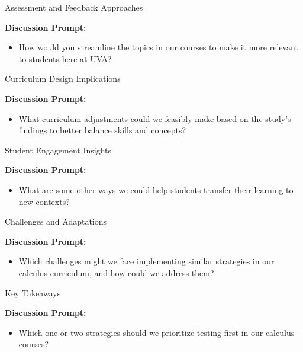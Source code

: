 \documentclass[dvipsnames]{beamer}
\begin{document}
\begin{frame}{Assessment and Feedback Approaches}


\textbf{Discussion Prompt:}
\begin{itemize}
    \item How would you streamline the topics in our courses to make it more relevant to students here at UVA?
\end{itemize}
\end{frame}

\begin{frame}{Curriculum Design Implications}


\textbf{Discussion Prompt:}
\begin{itemize}
    \item What curriculum adjustments could we feasibly make based on the study’s findings to better balance skills and concepts?
\end{itemize}
\end{frame}

\begin{frame}{Student Engagement Insights}

\textbf{Discussion Prompt:}
\begin{itemize}
    \item What are some other ways we could help students transfer their learning to new contexts?
\end{itemize}
\end{frame}

\begin{frame}{Challenges and Adaptations}


\textbf{Discussion Prompt:}
\begin{itemize}
    \item Which challenges might we face implementing similar strategies in our calculus curriculum, and how could we address them?
\end{itemize}
\end{frame}

\begin{frame}{Key Takeaways}


\textbf{Discussion Prompt:}
\begin{itemize}
    \item Which one or two strategies should we prioritize testing first in our calculus courses?
\end{itemize}
\end{frame}
\end{document}
